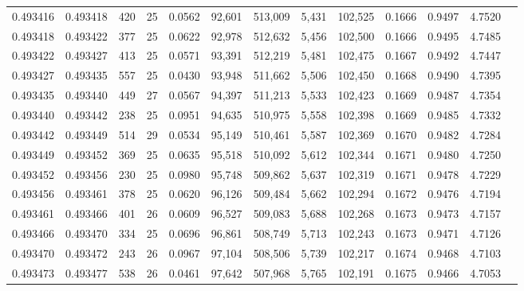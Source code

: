 \begin{tabular}{rrrrrrrrrrrrr}
0.493416 & 0.493418 & 420 &  25 &                                     0.0562 &  92,601 & 513,009 &   5,431 & 102,525 & 0.1666 & 0.9497 & 4.7520 \\
0.493418 & 0.493422 & 377 &  25 &                                     0.0622 &  92,978 & 512,632 &   5,456 & 102,500 & 0.1666 & 0.9495 & 4.7485 \\
0.493422 & 0.493427 & 413 &  25 &                                     0.0571 &  93,391 & 512,219 &   5,481 & 102,475 & 0.1667 & 0.9492 & 4.7447 \\
0.493427 & 0.493435 & 557 &  25 &                                     0.0430 &  93,948 & 511,662 &   5,506 & 102,450 & 0.1668 & 0.9490 & 4.7395 \\
0.493435 & 0.493440 & 449 &  27 &                                     0.0567 &  94,397 & 511,213 &   5,533 & 102,423 & 0.1669 & 0.9487 & 4.7354 \\
0.493440 & 0.493442 & 238 &  25 &                                     0.0951 &  94,635 & 510,975 &   5,558 & 102,398 & 0.1669 & 0.9485 & 4.7332 \\
0.493442 & 0.493449 & 514 &  29 &                                     0.0534 &  95,149 & 510,461 &   5,587 & 102,369 & 0.1670 & 0.9482 & 4.7284 \\
0.493449 & 0.493452 & 369 &  25 &                                     0.0635 &  95,518 & 510,092 &   5,612 & 102,344 & 0.1671 & 0.9480 & 4.7250 \\
0.493452 & 0.493456 & 230 &  25 &                                     0.0980 &  95,748 & 509,862 &   5,637 & 102,319 & 0.1671 & 0.9478 & 4.7229 \\
0.493456 & 0.493461 & 378 &  25 &                                     0.0620 &  96,126 & 509,484 &   5,662 & 102,294 & 0.1672 & 0.9476 & 4.7194 \\
0.493461 & 0.493466 & 401 &  26 &                                     0.0609 &  96,527 & 509,083 &   5,688 & 102,268 & 0.1673 & 0.9473 & 4.7157 \\
0.493466 & 0.493470 & 334 &  25 &                                     0.0696 &  96,861 & 508,749 &   5,713 & 102,243 & 0.1673 & 0.9471 & 4.7126 \\
0.493470 & 0.493472 & 243 &  26 &                                     0.0967 &  97,104 & 508,506 &   5,739 & 102,217 & 0.1674 & 0.9468 & 4.7103 \\
0.493473 & 0.493477 & 538 &  26 &                                     0.0461 &  97,642 & 507,968 &   5,765 & 102,191 & 0.1675 & 0.9466 & 4.7053 \\

\end{tabular}
